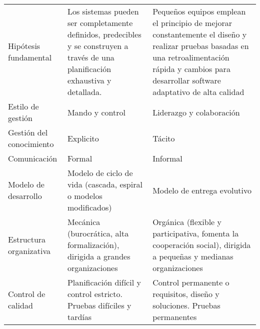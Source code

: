 \begin{longtable}{|p{5cm}|p{5cm}|p{5cm}|}
    \hline \hline
    \endlastfoot
    Hipótesis fundamental                          & Los sistemas pueden ser completamente definidos, predecibles y se construyen a través de una planificación exhaustiva y detallada. & Pequeños equipos emplean el principio de mejorar constantemente el diseño y realizar pruebas basadas en una retroalimentación rápida y cambios para desarrollar software adaptativo de alta calidad \\
    Estilo de gestión                              & Mando y control                                                                                                                    & Liderazgo y colaboración                                                                                                                                                                            \\
    Gestión del conocimiento                       & Explicito                                                                                                                          & Tácito                                                                                                                                                                                              \\
    Comunicación                                   & Formal                                                                                                                             & Informal                                                                                                                                                                                            \\
    Modelo de desarrollo                           & Modelo de ciclo de vida (cascada, espiral o modelos modificados)                                                                   & Modelo de entrega evolutivo                                                                                                                                                                         \\
    Estructura organizativa                        & Mecánica (burocrática, alta formalización), dirigida a grandes organizaciones                                                      & Orgánica (flexible y participativa, fomenta la cooperación social), dirigida a pequeñas y medianas organizaciones                                                                                   \\
    Control de calidad                             & Planificación difícil y control estricto. Pruebas difíciles y tardías                                                              & Control permanente o requisitos, diseño y soluciones. Pruebas permanentes                                                                                                                           \\

\end{longtable}
